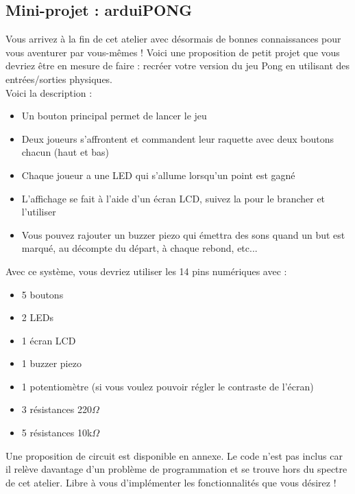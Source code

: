 \subsection{Mini-projet : arduiPONG}
Vous arrivez à la fin de cet atelier avec désormais de bonnes connaissances pour vous aventurer par vous-mêmes !
Voici une proposition de petit projet que vous devriez être en mesure de faire : recréer votre version du jeu Pong en utilisant des entrées/sorties physiques.
\\
Voici la description :
\begin{itemize}
	\item Un bouton principal permet de lancer le jeu
	\item Deux joueurs s'affrontent et commandent leur raquette avec deux boutons chacun (haut et bas)
	\item Chaque joueur a une LED qui s'allume lorsqu'un point est gagné
	\item L'affichage se fait à l'aide d'un écran LCD, suivez la  pour le brancher et l'utiliser
	\item Vous pouvez rajouter un buzzer piezo qui émettra des sons quand un but est marqué, au décompte du départ, à chaque rebond, etc...
\end{itemize}

Avec ce système, vous devriez utiliser les 14 pins numériques avec :
\begin{itemize}
	\item 5 boutons
	\item 2 LEDs
	\item 1 écran LCD
	\item 1 buzzer piezo
	\item 1 potentiomètre (si vous voulez pouvoir régler le contraste de l'écran)
	\item 3 résistances 220$\Omega$
	\item 5 résistances 10k$\Omega$
\end{itemize}

Une proposition de circuit est disponible en annexe.
Le code n'est pas inclus car il relève davantage d'un problème de programmation et se trouve hors du spectre de cet atelier.
Libre à vous d'implémenter les fonctionnalités que vous désirez !